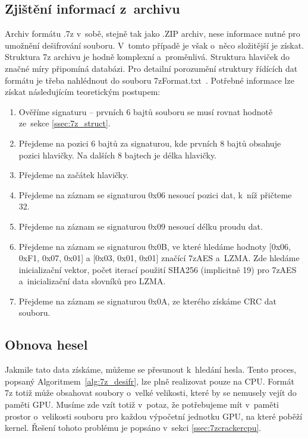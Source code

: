 \subsection{Zjištění informací z~archivu}
Archiv formátu .7z v~sobě, stejně tak jako .ZIP archiv, nese informace nutné pro umožnění
dešifrování souboru. V~tomto případě je však o~něco složitější je získat. Struktura 7z archivu
je hodně komplexní a~proměnlivá. Struktura hlaviček do značné míry připomíná databázi. Pro
detailní porozumění struktury řídících dat formátu je třeba nahlédnout do souboru
7zFormat.txt~\cite{Pavlov:2010}. Potřebné informace lze získat následujícím 
teoretickým postupem:
\begin{enumerate}
    \item Ověříme signaturu -- prvních 6 bajtů souboru se musí rovnat hodnotě ze~sekce \ref{ssec:7z_struct}. 
    \item Přejdeme na pozici 6 bajtů za signaturou, kde	prvních 8 bajtů obsahuje pozici hlavičky.
	Na dalších 8 bajtech je délka hlavičky.
    \item Přejdeme na začátek hlavičky.
    \item Přejdeme na záznam se signaturou 0x06 nesoucí pozici dat, k~níž přičteme 32.
    \item Přejdeme na záznam se signaturou 0x09 nesoucí délku proudu dat.
    \item Přejdeme na záznam se signaturou 0x0B, ve které hledáme hodnoty [0x06, 0xF1, 0x07, 0x01]
	a [0x03, 0x01, 0x01] značící 7zAES a~LZMA. Zde hledáme inicializační vektor, počet iterací použití SHA256 (implicitně
	19) pro 7zAES a~inicializační data slovníků pro LZMA.
    \item Přejdeme na záznam se signaturou 0x0A, ze kterého získáme CRC dat souboru.
\end{enumerate}

\subsection{Obnova hesel}
Jakmile tato data získáme, můžeme se přesunout k~hledání hesla. Tento proces, popsaný
Algoritmem~\ref{alg:7z_desifr}, lze plně realizovat pouze na CPU. Formát 7z totiž může obsahovat
soubory o~velké velikosti, které by se nemusely vejít do paměti GPU. Musíme zde vzít totiž
v~potaz, že potřebujeme mít v~paměti prostor o~velikosti souboru pro každou výpočetní jednotku GPU,
na které poběží kernel. Řešení tohoto problému je popsáno v~sekci \ref{ssec:7zcrackercpu}.

